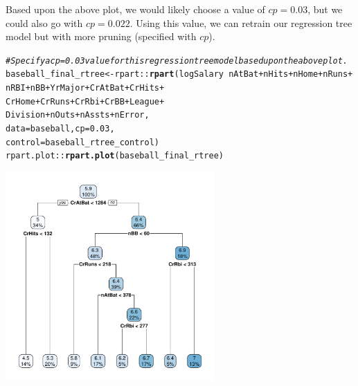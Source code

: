 \documentclass{article}\usepackage[]{graphicx}\usepackage[]{color}
\makeatletter
\newcommand{\hlnum}[1]{\textcolor[rgb]{0.686,0.059,0.569}{#1}}%
\newcommand{\hlcom}[1]{\textcolor[rgb]{0.678,0.584,0.686}{\textit{#1}}}%
\newcommand{\hlopt}[1]{\textcolor[rgb]{0,0,0}{#1}}%
\newcommand{\hlstd}[1]{\textcolor[rgb]{0.345,0.345,0.345}{#1}}%
\newcommand{\hlkwb}[1]{\textcolor[rgb]{0.69,0.353,0.396}{#1}}%
\newcommand{\hlkwc}[1]{\textcolor[rgb]{0.333,0.667,0.333}{#1}}%
\newcommand{\hlkwd}[1]{\textcolor[rgb]{0.737,0.353,0.396}{\textbf{#1}}}%
\newenvironment{kframe}{%
 \def\at@end@of@kframe{}%
 \ifinner\ifhmode%
  \def\at@end@of@kframe{\end{minipage}}%
  \begin{minipage}{\columnwidth}%
 \fi\fi%
 \def\FrameCommand##1{\hskip\@totalleftmargin \hskip-\fboxsep
 \colorbox{shadecolor}{##1}\hskip-\fboxsep
     \hskip-\linewidth \hskip-\@totalleftmargin \hskip\columnwidth}%
 \MakeFramed {\advance\hsize-\width
   \@totalleftmargin\z@ \linewidth\hsize
   \@setminipage}}%
 {\par\unskip\endMakeFramed%
 \at@end@of@kframe}
\newenvironment{knitrout}{}{} %
\makeatother
\begin{document}
Based upon the above plot, we would likely choose a value of $cp = 0.03$, but we could also go with $cp = 0.022$. Using this value, we can retrain our regression tree model but with more pruning (specified with $cp$).

\begin{knitrout}
\color{fgcolor}\begin{kframe}
\begin{alltt}
\hlcom{# Specify a cp=0.03 value for this regression tree model based upon the above plot.}
\hlstd{baseball_final_rtree} \hlkwb{<-}\hlstd{rpart}\hlopt{::}\hlkwd{rpart}\hlstd{(logSalary} \hlopt{~} \hlstd{nAtBat} \hlopt{+} \hlstd{nHits} \hlopt{+} \hlstd{nHome} \hlopt{+} \hlstd{nRuns} \hlopt{+}
                                      \hlstd{nRBI} \hlopt{+} \hlstd{nBB} \hlopt{+} \hlstd{YrMajor} \hlopt{+} \hlstd{CrAtBat} \hlopt{+} \hlstd{CrHits} \hlopt{+}
                                      \hlstd{CrHome} \hlopt{+} \hlstd{CrRuns} \hlopt{+} \hlstd{CrRbi} \hlopt{+} \hlstd{CrBB} \hlopt{+} \hlstd{League} \hlopt{+}
                                      \hlstd{Division} \hlopt{+} \hlstd{nOuts} \hlopt{+} \hlstd{nAssts} \hlopt{+} \hlstd{nError,}
                               \hlkwc{data} \hlstd{= baseball,} \hlkwc{cp} \hlstd{=} \hlnum{0.03}\hlstd{,}
                               \hlkwc{control} \hlstd{= baseball_rtree_control)}
\hlstd{rpart.plot}\hlopt{::}\hlkwd{rpart.plot}\hlstd{(baseball_final_rtree)}
\end{alltt}
\end{kframe}

{\centering \includegraphics[width=0.6\textwidth]{figure/unnamed-chunk-4-1} 

}



\end{knitrout}
\end{document}
